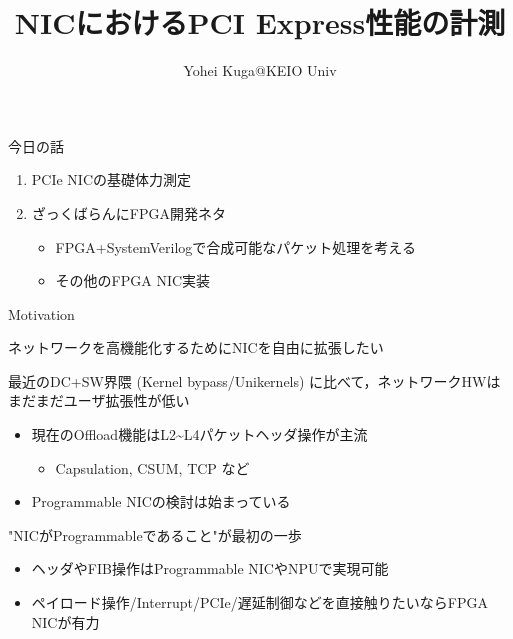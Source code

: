 \documentclass[10pt, compress]{beamer}
\title{NICにおけるPCI Express性能の計測}
\subtitle{}
\date[\today]{}
\author{Yohei Kuga@KEIO Univ}
\institute{高速PCルータ研究会 2015/5}
\begin{document}
\maketitle


\begin{frame}[fragile,t]{今日の話}
\begin{enumerate}
\item PCIe NICの基礎体力測定
\item ざっくばらんにFPGA開発ネタ
	\begin{itemize}
	\item FPGA+SystemVerilogで合成可能なパケット処理を考える
	\item その他のFPGA NIC実装
	\end{itemize}
\end{enumerate}
\end{frame}


\begin{frame}[fragile,t]{Motivation}

ネットワークを高機能化するためにNICを自由に拡張したい
\vspace{.5em}

最近のDC+SW界隈 (Kernel bypass/Unikernels) に比べて，ネットワークHWはまだまだユーザ拡張性が低い
\vspace{-.5em}
\begin{itemize}
\item 現在のOffload機能はL2\~{}L4パケットヘッダ操作が主流
    \begin{itemize}
        \item Capsulation, CSUM, TCP など
    \end{itemize}
\item Programmable NICの検討は始まっている
\end{itemize}
\vspace{.5em}

"NICがProgrammableであること"が最初の一歩
\vspace{-.5em}
\begin{itemize}
\item ヘッダやFIB操作はProgrammable NICやNPUで実現可能
\item ペイロード操作/Interrupt/PCIe/遅延制御などを直接触りたいならFPGA NICが有力
\end{itemize}

\end{frame}
\end{document}
